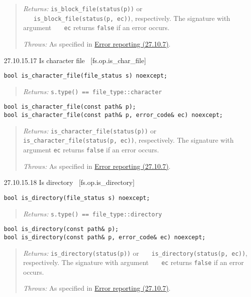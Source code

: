 \begin{quote}
\emph{Returns:} \texttt{is\_block\_file(status(p))} or
\texttt{\ \ \ is\_block\_file(status(p,\ ec))}, respectively. The
signature with argument \texttt{\ \ \ ec} returns \texttt{false} if an
error occurs.

\emph{Throws:} As specified in \hyperref[Error-reporting]{Error
reporting (27.10.7)}.
\end{quote}

27.10.15.17 Is character file~ {[}fs.op.is\_char\_file{]}

\begin{verbatim}
bool is_character_file(file_status s) noexcept;
\end{verbatim}

\begin{quote}
\emph{Returns:} \texttt{s.type()\ ==\ file\_type::character}
\end{quote}

\begin{verbatim}
bool is_character_file(const path& p);
bool is_character_file(const path& p, error_code& ec) noexcept;
\end{verbatim}

\begin{quote}
\emph{Returns:} \texttt{is\_character\_file(status(p))} or
\texttt{is\_character\_file(status(p,\ ec))}, respectively. The
signature with argument \texttt{ec} returns \texttt{false} if an error
occurs.

\emph{Throws:} As specified in \hyperref[Error-reporting]{Error
reporting (27.10.7)}.
\end{quote}

27.10.15.18 Is directory~ {[}fs.op.is\_directory{]}

\begin{verbatim}
bool is_directory(file_status s) noexcept;
\end{verbatim}

\begin{quote}
\emph{Returns:} \texttt{s.type()\ ==\ file\_type::directory}
\end{quote}

\begin{verbatim}
bool is_directory(const path& p);
bool is_directory(const path& p, error_code& ec) noexcept;
\end{verbatim}

\begin{quote}
\emph{Returns:} \texttt{is\_directory(status(p))} or
\texttt{\ \ \ is\_directory(status(p,\ ec))}, respectively. The
signature with argument \texttt{\ \ \ ec} returns \texttt{false} if an
error occurs.

\emph{Throws:} As specified in \hyperref[Error-reporting]{Error
reporting (27.10.7)}.
\end{quote}

